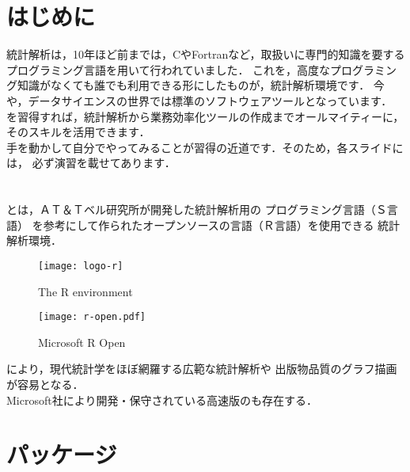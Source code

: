 \documentclass[../main]{subfiles}
\begin{document}
\section{はじめに}

統計解析は，10年ほど前までは，CやFortranなど，取扱いに専門的知識を要する
プログラミング言語を用いて行われていました．
これを，高度なプログラミング知識がなくても誰でも利用できる形にしたものが，統計解析環境\R です．
今や，データサイエンスの世界では標準のソフトウェアツールとなっています．\\[3mm]

\R を習得すれば，統計解析から業務効率化ツールの作成までオールマイティーに，
そのスキルを活用できます．\\[3mm]

手を動かして自分でやってみることが\R 習得の近道です．そのため，各スライドには，
必ず演習を載せてあります．

\section{\R}

\R とは，ＡＴ＆Ｔベル研究所が開発した統計解析用の
プログラミング言語（Ｓ言語）
を参考にして作られたオープンソースの言語（Ｒ言語）を使用できる
統計解析環境．\\[5mm]

\begin{minipage}{0.45\textwidth}
  \begin{figure}[H]%
  \centering
  \texttt{[image: logo-r]}
  \label{fig:logo-r}
  \caption{The R environment}
  \end{figure}
\end{minipage}
\hspace{3mm}
\begin{minipage}{0.45\textwidth}
  \begin{figure}[H]
  \centering
  \texttt{[image: r-open.pdf]}
  \label{fig:r-open}
  \caption{Microsoft R Open}
  \end{figure}
\end{minipage}

\R により，現代統計学をほぼ網羅する広範な統計解析や
出版物品質のグラフ描画が容易となる．\\[3mm]

Microsoft社により開発・保守されている高速版の\R も存在する．

\section{\R パッケージ}
\end{document}
